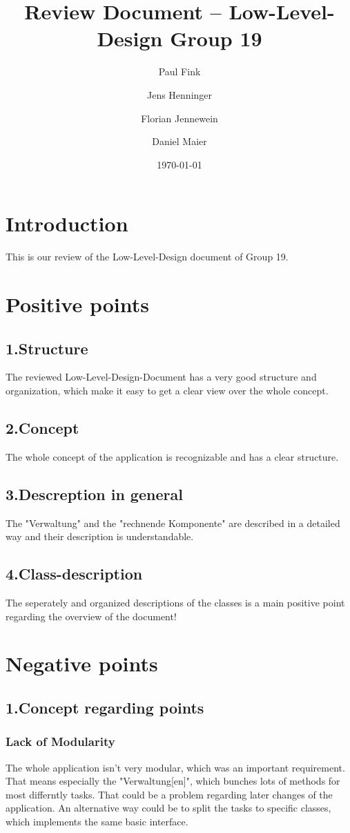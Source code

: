 \documentclass{article}
\title{Review Document -- Low-Level-Design Group 19 }
\author{Paul Fink \and Jens Henninger \and Florian Jennewein \and Daniel Maier}
\date{\today}
\begin{document}
\maketitle

\section{Introduction}
This is our review of the Low-Level-Design document of Group 19. 
\section{Positive points}
\subsection{1.Structure}
The reviewed Low-Level-Design-Document has a very good structure and organization, which make it easy to get a clear view over the whole concept. 
\subsection{2.Concept}
The whole concept of the application is recognizable and has a clear structure.
\subsection{3.Descreption in general}
The "Verwaltung" and the "rechnende Komponente" are described in a detailed way and their description is understandable.
\subsection{4.Class-description} 
The seperately and organized descriptions of the classes is a main positive point regarding the overview of the document!
\section{Negative points}
\subsection{1.Concept regarding points}
\subsubsection{Lack of Modularity}
The whole application isn't very modular, which was an important requirement. That means especially the "Verwaltung[en]", which bunches lots of methods for most differntly tasks. That could be a problem regarding later changes of the application. An alternative way could be to split the tasks to specific classes, which implements the same basic interface.
\end{document}
